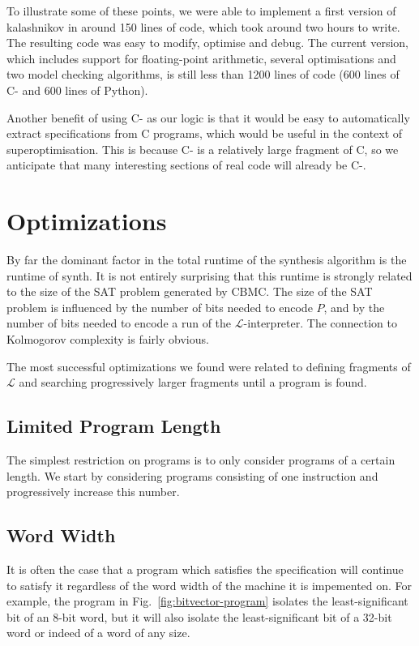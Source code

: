 \documentclass[a4paper]{llncs}
\begin{document}
To illustrate some of these points, we were able to implement a first
version of {\sc kalashnikov} in around 150 lines of code, which took around
two hours to write.  The resulting code was easy to modify, optimise and
debug.  The current version, which includes support for floating-point
arithmetic, several optimisations and two model checking algorithms, is
still less than 1200 lines of code (600 lines of C- and 600 lines of
Python).

Another benefit of using C- as our logic is that it would be easy to
automatically extract specifications from C programs, which would be
useful in the context of superoptimisation.  This is because C- is
a relatively large fragment of C, so we anticipate that many interesting
sections of real code will already be C-.

\section{Optimizations}

By far the dominant factor in the total runtime of the synthesis algorithm is
the runtime of {\sc synth}.  It is not entirely surprising that this runtime
is strongly related to the size of the SAT problem generated by CBMC.  The size
of the SAT problem is influenced by the number of bits needed to encode $P$,
and by the number of bits needed to encode a run of the $\mathcal{L}$-interpreter.
The connection to Kolmogorov complexity is fairly obvious.

The most successful optimizations we found were related to defining
fragments of $\mathcal{L}$ and searching progressively larger fragments
until a program is found.

\subsection{Limited Program Length}

The simplest restriction on programs is to only consider programs of a certain length.
We start by considering programs consisting of one instruction and progressively
increase this number.

\subsection{Word Width}

It is often the case that a program which satisfies the specification will
continue to satisfy it regardless of the word width of the machine it is
impemented on.  For example, the program in Fig.~\ref{fig:bitvector-program}
isolates the least-significant bit of an 8-bit word, but it will also
isolate the least-significant bit of a 32-bit word or indeed of a word of
any size.
\end{document}
